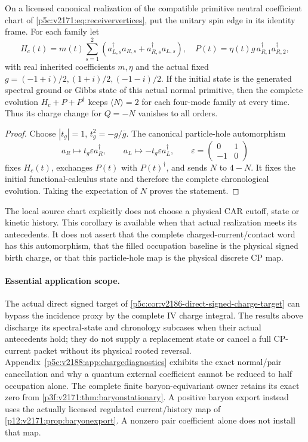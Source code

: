 \documentclass[12pt,a4paper]{article}
\begin{document}
\begin{corollary}
\label{p5c:v2188:cor:primitivealltimezero}
On a licensed canonical realization of the compatible primitive neutral
coefficient chart of \ref{p5c:v2171:eq:receiververtices}, put the
unitary spin edge in its identity frame. For each family let
\[
 H_c(t)=m(t)\sum_{s=1}^2(a_{L,s}^\dagger a_{R,s}
                       +a_{R,s}^\dagger a_{L,s}),\quad
 P(t)=\eta(t)g\,a_{R,1}^\dagger a_{R,2}^\dagger ,
\]
with real inherited coefficients \(m,\eta\) and the actual fixed
\(g=(-1+i)/2,(1+i)/2,(-1-i)/2\). If the initial state is the generated
spectral ground or Gibbs state of this actual normal primitive, then the
complete evolution \(H_c+P+P^\dagger\) keeps \(\langle N\rangle=2\) for
each four-mode family at every time. Thus its charge change for \(Q=-N\)
vanishes to all orders.
\end{corollary}
\begin{proof}
Choose \(|t_g|=1\), \(t_g^2=-g/\overline g\). The canonical particle-hole
automorphism
\[
 a_R\mapsto t_g\varepsilon a_R^\dagger,\qquad
 a_L\mapsto-t_g\varepsilon a_L^\dagger,\qquad
 \varepsilon=\begin{pmatrix}0&1\\-1&0\end{pmatrix}
\]
fixes \(H_c(t)\), exchanges \(P(t)\) with \(P(t)^\dagger\), and sends
\(N\) to \(4-N\). It fixes the initial functional-calculus state and
therefore the complete chronological evolution. Taking the expectation
of \(N\) proves the statement.
\end{proof}
The local source chart explicitly does not choose a physical CAR cutoff,
state or kinetic history. This corollary is available when that actual
realization meets its antecedents. It does not assert that the complete
charged-current/contact word has this automorphism, that the filled
occupation baseline is the physical signed birth charge, or that this
particle-hole map is the physical discrete CP map.

\paragraph{Essential application scope.}
The actual direct signed target of
\ref{p5c:cor:v2186-direct-signed-charge-target} can bypass the incidence
proxy by the complete IV charge integral. The results above discharge
its spectral-state and chronology subcases when their actual antecedents
hold; they do not supply a replacement state or cancel a full CP-current
packet without its physical rooted reversal. Appendix~\ref{p5c:v2188:app:chargediagnostics}
exhibits the exact normal/pair cancellation and why a quantum external
coefficient cannot be reduced to half occupation alone. The complete finite
baryon-equivariant owner retains its exact zero from
\ref{p3f:v2171:thm:baryonstationary}. A positive baryon export instead
uses the actually licensed regulated current/history map of
\ref{p12:v2171:prop:baryonexport}. A nonzero pair coefficient alone
does not install that map.
\end{document}
